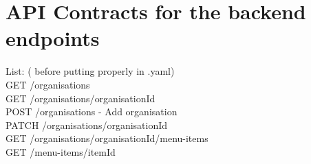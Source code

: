 \documentclass{article}
\begin{document}
    \section{API Contracts for the backend endpoints}

    List: ( before putting properly in .yaml)\\
    GET /organisations\\
    GET /organisations/{organisationId} \\
    POST /organisations - Add organisation\\
    PATCH /organisations/{organisationId}\\
    GET /organisations/{organisationId}/menu-items\\
    GET /menu-items/{itemId}\\
    
    
\end{document}
